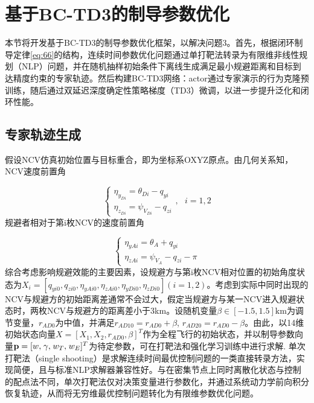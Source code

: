 \section{基于BC-TD3的制导参数优化}
本节将开发基于BC-TD3的制导参数优化框架，以解决问题3。首先，根据闭环制导定律\eqref{eq:66}的结构，连续时间参数优化问题通过单打靶法转录为有限维非线性规划（NLP）问题，并在随机抽样初始条件下离线生成满足最小规避距离和目标到达精度约束的专家轨迹。然后构建BC-TD3网络：actor通过专家演示的行为克隆预训练，随后通过双延迟深度确定性策略梯度（TD3）微调，以进一步提升泛化和闭环性能。

\subsection{专家轨迹生成}
假设NCV仿真初始位置与目标重合，即为坐标系OXYZ原点。由几何关系知，NCV速度前置角

\begin{equation}
\label{eq:67}
\left\{ {\begin{array}{*{20}{l}}
  {{\eta _{{y_{Di}}}} = {\theta _{Di}} - {q_{yi}}} \\ 
  {{\eta _{{z_{Di}}}} = {\psi _{{V_{Di}}}} - {q_{zi}}} 
\end{array},{\text{ }}i = 1,2} \right.
\end{equation}
规避者相对于第i枚NCV的速度前置角

\begin{equation}
\label{eq:68}
\left\{ {\begin{array}{*{20}{l}}
  {{\eta _{yAi}} = {\theta _A} + {q_{yi}}} \\ 
  {{\eta _{zAi}} = {\psi _{{V_A}}} - {q_{zi}} - \pi } 
\end{array}} \right.
\end{equation}
综合考虑影响规避效能的主要因素，设规避方与第i枚NCV相对位置的初始角度状态为${X_i} = [{q_{yi0}},{q_{zi0}},{\eta _{yAi0}},{\eta _{zAi0}},{\eta _{yDi0}},{\eta _{zDi0}}](i = 1,2)$。考虑到实际中同时出现的NCV与规避方的初始距离差通常不会过大，假定当规避方与某一NCV进入规避状态时，两枚NCV与规避方的距离差小于3km。设随机变量$\beta  \in [ - 1.5,1.5]{\text{km}}$为调节变量，${r_{AD{\text{0}}}}$为中值，并满足${r_{AD10}} = {r_{AD0}} + \beta $, ${r_{AD20}} = {r_{AD0}} - \beta $。由此，以14维初始状态向量$X = {[{X_1},{X_2},{r_{AD0}},\beta ]^T}$作为全程飞行的初始状态，并以制导参数向量${\mathbf{p}} = {[w,{\kern 1pt} \gamma ,{\kern 1pt} {w_T},{\kern 1pt} {w_E}]^T}$为待定参数，可在打靶法和强化学习训练中进行求解.
单次打靶法（single shooting）是求解连续时间最优控制问题的一类直接转录方法，实现简便，且与标准NLP求解器兼容性好。与在密集节点上同时离散化状态与控制的配点法不同，单次打靶法仅对决策变量进行参数化，并通过系统动力学前向积分恢复轨迹，从而将无穷维最优控制问题转化为有限维参数优化问题。

